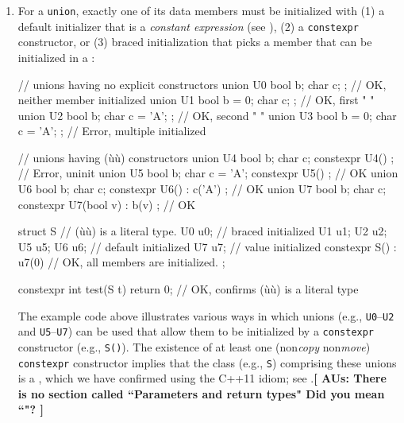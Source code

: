 \begin{enumerate}
{\begin{emcppslisting}
static_assert( S3().d_i  == 0, "");  // OK, value initialization
static_assert( S3{}.d_i  == 0, "");  // OK, braced initialization
static_assert( S3{7}.d_i == 7, "");  // Error, non(ù{}ù) constructor
\end{emcppslisting}
}
    

\item{For a \lstinline!union!, exactly one of its data members must be initialized with (1) a default initializer that is a \emph{constant expression} (see ), (2) a \lstinline!constexpr! constructor, or (3) braced initialization that picks a member that can be initialized in a :

\begin{emcppslisting} %
// unions having no explicit constructors
union U0 { bool b;      char c;       };  // OK, neither member initialized
union U1 { bool b = 0;  char c;       };  // OK, first      "       "
union U2 { bool b;      char c = 'A'; };  // OK, second     "       "
union U3 { bool b = 0;  char c = 'A'; };  // Error, multiple initialized

// unions having (ù{}ù) constructors
union U4 { bool b; char c;        constexpr U4() { } };  // Error, uninit
union U5 { bool b; char c = 'A';  constexpr U5() { } };               // OK
union U6 { bool b; char c;        constexpr U6() : c('A') { } };      // OK
union U7 { bool b; char c;        constexpr U7(bool v) : b(v) { } };  // OK

struct S                         // (ù{}ù) is a literal type.
{
    U0 u0{};                     // braced  initialized
    U1 u1; U2 u2; U5 u5; U6 u6;  // default initialized
    U7 u7;                       // value   initialized
    constexpr S() : u7(0) { }    // OK, all members are initialized.
};

constexpr int test(S t) { return 0; }  // OK, confirms (ù{}ù) is a literal type
\end{emcppslisting}
    

\noindent The example code above illustrates various ways in which unions (e.g.,
\lstinline!U0!--\lstinline!U2! and \lstinline!U5!--\lstinline!U7!) can be used that
allow them to be initialized by a \lstinline!constexpr! constructor (e.g.,
\lstinline!S()!). The existence of at least one (non\emph{copy}
non\emph{move}) \lstinline!constexpr! constructor implies that the class
(e.g., \lstinline!S!) comprising these unions is a ,
which we have confirmed using the C++11  idiom;
see .\textbf{[ AUs: There is no section called ``Parameters and return types" Did you mean ``"? ] }
}


\end{enumerate}
